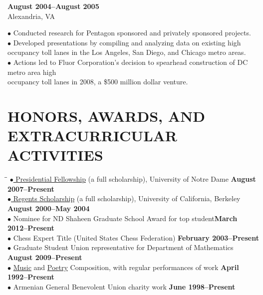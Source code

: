 \documentclass{resume}
\begin{document}
\begin{resume}
\begin{tabbing}
	\textbf{August 2004--August 2005}\\
		\>Alexandria, VA
	\end{tabbing}\vspace{-15pt}
	$\bullet$ Conducted research for Pentagon sponsored and privately
	sponsored projects. 
	\\ 
	$\bullet$ Developed presentations by compiling and
	analyzing data on existing high occupancy toll lanes in 
	\phantom{$\bullet$} the Los
	Angeles, San Diego, and
	Chicago metro areas.  
	\\
	$\bullet$ Actions led to Fluor Corporation's decision to
	spearhead construction of DC metro area high \\
	\phantom{$\bullet$} occupancy toll lanes
	in 2008, a \$500
	million dollar venture.

	\section{HONORS, AWARDS, AND EXTRACURRICULAR ACTIVITIES} 
	\vspace{-0.1in}
	\begin{tabbing}
	  \hspace{2.3in}\= \hspace{2.6in}\= \kill
    \href{http://graduateschool.nd.edu/admissions/financial-support/prestigious-fellowships/presidential-fellowships-arthur-j-schmitt-fellowships/}{$\bullet$ Presidential
    Fellowship} (a full scholarship), University of Notre Dame \>\> \textbf{August 2007--Present} \\
    \href{http://students.berkeley.edu/finaid/undergraduates/types_regents.htm}{$\bullet$ Regents
    Scholarship} (a full scholarship), University of California, 
    Berkeley \>\> \textbf{August 2000--May 2004} \\
$\bullet$ Nominee for ND Shaheen Graduate School Award for top student\>\>\textbf{March 2012--Present}
\\
    $\bullet$ Chess Expert Title (United States Chess Federation) \>\>\textbf{February 2003--Present}
    \\
 $\bullet$ Graduate Student Union representative for Department of Mathematics \>\>\textbf{August 2009--Present}\\
    $\bullet$ \href{http://davidkarapetyan.com/music.php}{Music} and
    \href{http://davidkarapetyan.com/poetry.php}{Poetry} Composition, with regular
    performances of work \>\> \textbf{April 1992--Present}\\
    $\bullet$ Armenian General Benevolent Union charity work \>\> \textbf{June 1998--Present}\\
      \end{tabbing}

\end{resume}
\end{document}

